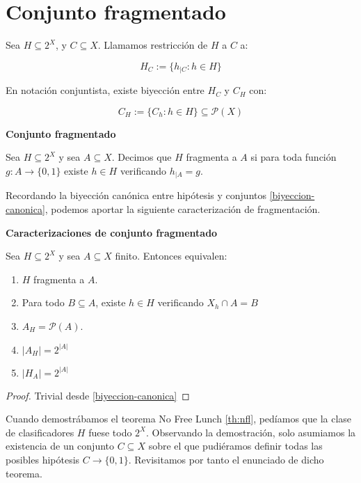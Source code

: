 \section{Conjunto fragmentado}

\begin{definition}
Sea $H\subseteq 2^X$, y $C \subseteq X$. Llamamos restricción de $H$ a $C$ a:

\[H_{C} := \{h_{|C} : h\in H\}\]

En notación conjuntista, existe biyección entre $H_C$ y $C_{H}$ con:

\[C_{H} := \{C_h : h\in H\} \subseteq \mathcal{P}(X)\]
\end{definition}


\begin{definition} \textbf{Conjunto fragmentado}

 Sea $H\subseteq 2^X$ y sea $A\subseteq X$. Decimos que $H$ fragmenta a $A$ si para toda función $g:A\rightarrow \{0,1\}$ 
 existe $h\in H$ verificando $h_{|A} = g$.
\end{definition}

Recordando la biyección canónica entre hipótesis y conjuntos \ref{biyeccion-canonica}, podemos aportar la siguiente 
caracterización de fragmentación.

\begin{fact} \textbf{Caracterizaciones de conjunto fragmentado}

 Sea $H\subseteq 2^X$ y sea $A\subseteq X$ finito. Entonces equivalen:
 
 \begin{enumerate}[i]
  \item $H$ fragmenta a $A$.
  \item Para todo $B\subseteq A$, existe $h\in H$ verificando $X_h \cap A = B$
  \item $A_H = \mathcal{P}(A)$.
  \item $|A_H| = 2^{|A|}$
  \item $|H_A| = 2^{|A|}$
 \end{enumerate}
\end{fact}

  \begin{proof}
  Trivial desde \ref{biyeccion-canonica}
  \end{proof}


Cuando demostrábamos el teorema No Free Lunch \ref{th:nfl}, pedíamos que la clase de clasificadores $H$ fuese todo $2^X$. 
Observando la demostración, solo asumiamos la existencia de un conjunto $C\subseteq X$ sobre el que pudiéramos definir 
todas las posibles hipótesis $C \rightarrow \{0,1\}$. Revisitamos por tanto el enunciado de dicho teorema.

